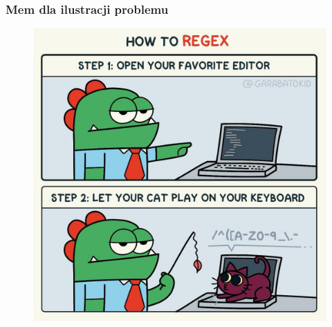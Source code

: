 \documentclass[10pt,t]{beamer}
\begin{document}
\begin{frame}
  \frametitle{Mem dla ilustracji problemu}

  \vspace{-0.5em}


  \begin{figure}

    \label{fig:How-to-regex}

    \centering


    \includegraphics[scale=0.18]
    {./Presentations-pictures/Miscancellous-pictures/How-to-regex.jpg}

  \end{figure}

\end{frame}
\end{document}
